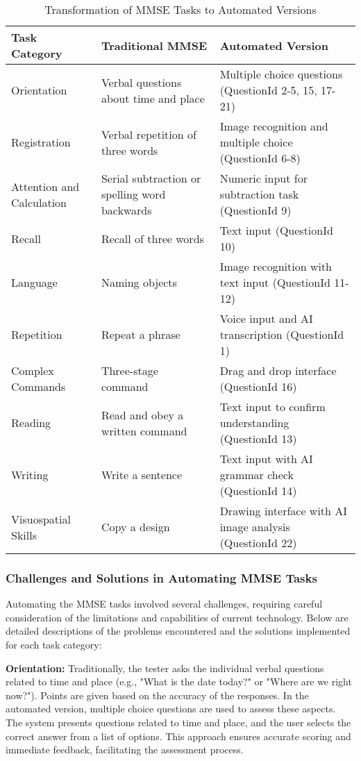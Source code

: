\begin{table}[h]
\centering
\caption{Transformation of MMSE Tasks to Automated Versions}
\begin{tabular}{|p{}|p{}|p{}|}
\hline
\textbf{Task Category} & \textbf{Traditional MMSE} & \textbf{Automated Version} \\
\hline
Orientation & Verbal questions about time and place & Multiple choice questions (QuestionId 2-5, 15, 17-21) \\
\hline
Registration & Verbal repetition of three words & Image recognition and multiple choice (QuestionId 6-8) \\
\hline
Attention and Calculation & Serial subtraction or spelling word backwards & Numeric input for subtraction task (QuestionId 9) \\
\hline
Recall & Recall of three words & Text input (QuestionId 10) \\
\hline
Language & Naming objects & Image recognition with text input (QuestionId 11-12) \\
\hline
Repetition & Repeat a phrase & Voice input and AI transcription (QuestionId 1) \\
\hline
Complex Commands & Three-stage command & Drag and drop interface (QuestionId 16) \\
\hline
Reading & Read and obey a written command & Text input to confirm understanding (QuestionId 13) \\
\hline
Writing & Write a sentence & Text input with AI grammar check (QuestionId 14) \\
\hline
Visuospatial Skills & Copy a design & Drawing interface with AI image analysis (QuestionId 22) \\
\hline
\end{tabular}
\label{tab:mmse-transformation}
\end{table}

\subsubsection{Challenges and Solutions in Automating MMSE Tasks}

Automating the MMSE tasks involved several challenges, requiring careful consideration of the limitations and capabilities of current technology. Below are detailed descriptions of the problems encountered and the solutions implemented for each task category:

\textbf{Orientation:} Traditionally, the tester asks the individual verbal questions related to time and place (e.g., "What is the date today?" or "Where are we right now?"). Points are given based on the accuracy of the responses. In the automated version, multiple choice questions are used to assess these aspects. The system presents questions related to time and place, and the user selects the correct answer from a list of options. This approach ensures accurate scoring and immediate feedback, facilitating the assessment process.

